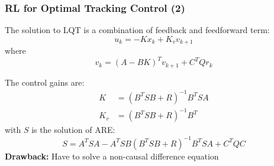\documentclass{beamer}
\begin{document}
			\begin{frame}\frametitle{RL for Optimal Tracking Control (2)}
				\fontsize{8}{4}\selectfont
				The solution to LQT is a combination of feedback and feedforward term: 
				\begin{equation} 
				u_{k} = -Kx_k + K_vv_{k+1} 
				\end{equation}		
				where
				\begin{equation}
				v_k = (A-BK)^Tv_{k+1} + C^TQr_k
				\end{equation}\vspace{1mm}
				
				The control gains are:
				\begin{equation}
				\begin{split}
				K &= (B^TSB + R)^{-1}B^TSA \\
				K_v &= (B^TSB + R)^{-1}B^T
				\end{split}
				\end{equation}
				with $S$ is the solution of ARE:
				\begin{equation}
				S = A^TSA - A^TSB(B^TSB+R)^{-1}B^TSA + C^TQC
				\end{equation}
				\fontsize{9}{4}\selectfont	
				\textbf{Drawback:} Have to solve a non-causal difference equation 
			\end{frame}
			
\end{document}
